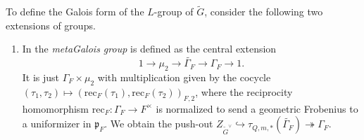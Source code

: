 \documentclass[a4paper,10pt]{article}
\begin{document}
To define the Galois form of the $L$-group of $\tilde{G}$, consider the following two extensions of groups.
\begin{enumerate}
	\item In \cite[\S 4.1]{Weis17} the \emph{metaGalois group} is defined as the central extension
	\begin{equation}\label{eqn:metaGalois}
		1 \to \mu_2 \to \widetilde{\Gamma_F} \to \Gamma_F \to 1.
	\end{equation}
	It is just $\Gamma_F \times \mu_2$ with multiplication given by the cocycle $(\tau_1, \tau_2) \mapsto (\text{rec}_F(\tau_1), \text{rec}_F(\tau_2))_{F,2}$, where the reciprocity homomorphism $\text{rec}_F: \Gamma_F \to F^\times$ is normalized to send a geometric Frobenius to a uniformizer in $\mathfrak{p}_F$. We obtain the push-out $Z_{\tilde{G}^\vee} \hookrightarrow \tau_{Q,m,*}(\widetilde{\Gamma_F}) \twoheadrightarrow \Gamma_F$.
	

\end{enumerate}
\end{document}
